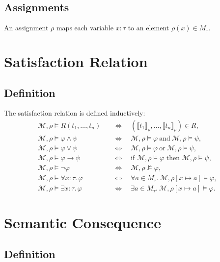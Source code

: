 \subsection{Assignments}

An assignment $\rho$ maps each variable $x:\tau$ to an element $\rho(x)\in M_\tau$.

\section{Satisfaction Relation}

\subsection{Definition}

The satisfaction relation is defined inductively:
\begin{align*}
\mathcal{M},\rho \models R(t_1,\dots,t_n)
&\quad\Longleftrightarrow\quad
(\llbracket t_1 \rrbracket_\rho,\dots,\llbracket t_n \rrbracket_\rho) \in R,\\[4pt]
\mathcal{M},\rho \models \varphi\land\psi
&\quad\Longleftrightarrow\quad
\mathcal{M},\rho\models\varphi\ \text{and}\ \mathcal{M},\rho\models\psi,\\[4pt]
\mathcal{M},\rho \models \varphi\lor\psi
&\quad\Longleftrightarrow\quad
\mathcal{M},\rho\models\varphi\ \text{or}\ \mathcal{M},\rho\models\psi,\\[4pt]
\mathcal{M},\rho \models \varphi\to\psi
&\quad\Longleftrightarrow\quad
\text{if }\mathcal{M},\rho\models\varphi\text{ then }\mathcal{M},\rho\models\psi,\\[4pt]
\mathcal{M},\rho \models \lnot\varphi
&\quad\Longleftrightarrow\quad
\mathcal{M},\rho\nvDash\varphi,\\[4pt]
\mathcal{M},\rho \models \forall x\!:\!\tau.\,\varphi
&\quad\Longleftrightarrow\quad
\forall a\in M_\tau.\ \mathcal{M},\rho[x\mapsto a]\models\varphi,\\[4pt]
\mathcal{M},\rho \models \exists x\!:\!\tau.\,\varphi
&\quad\Longleftrightarrow\quad
\exists a\in M_\tau.\ \mathcal{M},\rho[x\mapsto a]\models\varphi.
\end{align*}

\section{Semantic Consequence}

\subsection{Definition}

